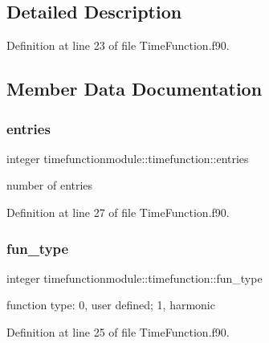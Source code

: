 \subsection{Detailed Description}


Definition at line 23 of file Time\+Function.\+f90.



\subsection{Member Data Documentation}
\mbox{\label{structtimefunctionmodule_1_1timefunction_a0f07f62ccbe6c9bcc7d9418b4157b234}} 
\subsubsection{\texorpdfstring{entries}{entries}}
{\footnotesize\ttfamily integer timefunctionmodule\+::timefunction\+::entries\hspace{0.3cm}{\ttfamily [private]}}



number of entries 



Definition at line 27 of file Time\+Function.\+f90.

\mbox{\label{structtimefunctionmodule_1_1timefunction_acd580915b25f29aa47c58467c394d2f4}} 
\subsubsection{\texorpdfstring{fun\+\_\+type}{fun\_type}}
{\footnotesize\ttfamily integer timefunctionmodule\+::timefunction\+::fun\+\_\+type\hspace{0.3cm}{\ttfamily [private]}}



function type\+: 0, user defined; 1, harmonic 



Definition at line 25 of file Time\+Function.\+f90.

